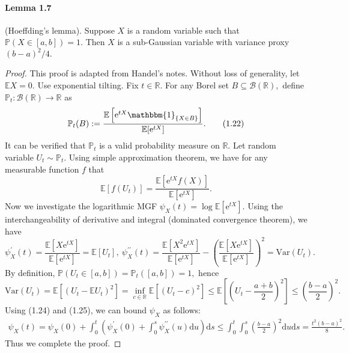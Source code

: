 \documentclass{article}
\newcommand{\E}{\mathbb{E}}
\begin{document}
\paragraph{Lemma 1.7} (Hoeffding's lemma). Suppose $X$ is a random variable such that $\mathbb{P}(X\in[a,b])=1.$ Then $X$ is a sub-Gaussian variable with variance proxy $(b-a)^2/4.$
\begin{proof}
This proof is adapted from Handel's notes. Without loss of generality, let $\E X=0.$ Use exponential tilting. Fix $t\in\mathbb{R}.$ For any Borel set $B\subseteq\mathcal{B}(\mathbb{R}),$ define $\mathbb{P}_t:\mathcal{B}(\mathbb{R})\to\mathbb{R}$ as
\begin{equation*}
	\mathbb{P}_t(B) := \frac{\E\left[\mathrm{e}^{tX}\mathbbm{1}_{\{X\in B\}}\right]}{\E[\mathrm{e}^{tX}]}.\tag{1.22}
\end{equation*}
It can be verified that $\mathbb{P}_t$ is a valid probability measure on $\mathbb{R}.$ Let random variable $U_t\sim\mathbb{P}_t.$ Using simple approximation theorem, we have for any measurable function $f$ that
\begin{equation*}
	\mathbb{E}[f(U_t)] = \frac{\E[\mathrm{e}^{tX}f(X)]}{\E[\mathrm{e}^{tX}]}.\tag{1.23}
\end{equation*}
Now we investigate the logarithmic MGF $\psi_X(t) = \log\E[\mathrm{e}^{tX}].$ Using the interchangeability of derivative and integral (dominated convergence theorem), we have
\begin{equation*}
	\psi_X^\prime(t) = \frac{\E[X\mathrm{e}^{tX}]}{\E[\mathrm{e}^{tX}]} = \E[U_t],\ 
	\psi_X^{\prime\prime}(t) = \frac{\E[X^2\mathrm{e}^{tX}]}{\E[\mathrm{e}^{tX}]} - \left(\frac{\E[X\mathrm{e}^{tX}]}{\E[\mathrm{e}^{tX}]}\right)^2 = \mathrm{Var}(U_t).\tag{1.24}
\end{equation*}
By definition, $\mathbb{P}(U_t\in[a,b]) = \mathbb{P}_t([a,b]) = 1,$ hence
\begin{equation*}
	\mathrm{Var}(U_t) = \E[(U_t-\mathbb{E}U_t)^2] = \inf_{c\in\mathbb{R}} \E[(U_t - c)^2] \leq \E\left[\left(U_t - \frac{a+b}{2}\right)^2\right]\leq \left(\frac{b-a}{2}\right)^2.\tag{1.25}
\end{equation*}
Using (1.24) and (1.25), we can bound $\psi_X$ as follows:
\begin{align*}
	\psi_X(t) = \psi_X(0) + \int_0^t\left(\psi_X^\prime(0) +\int_0^s\psi_X^{\prime\prime}(u)\mathrm{d}u\right)\mathrm{d}s \leq \int_0^t\int_0^s\left(\frac{b-a}{2}\right)^2\mathrm{d}u\mathrm{d}s = \frac{t^2(b-a)^2}{8}.\tag{1.26}
\end{align*}
Thus we complete the proof.
\end{proof}
\end{document}
